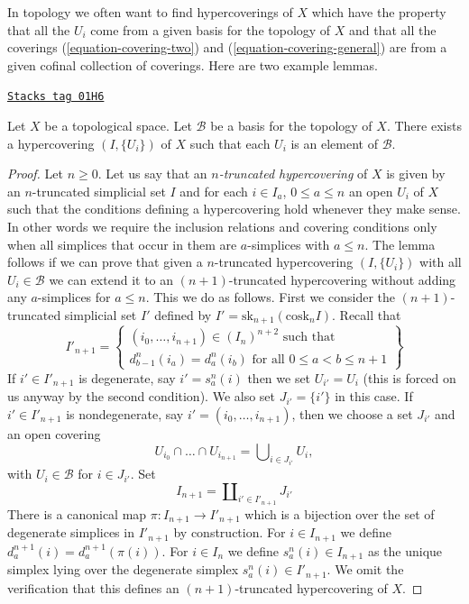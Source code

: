 In topology we often want to find hypercoverings of $X$ which
have the property that all the $U_i$ come from a given basis for the topology
of $X$ and that all the coverings
(\ref{equation-covering-two}) and (\ref{equation-covering-general})
are from a given cofinal collection of coverings.
Here are two example lemmas.

\begin{lemma}
\label{hypercovering-lemma-basis-hypercovering}
\href{https://stacks.math.columbia.edu/tag/01H6}{\texttt{Stacks tag 01H6}}

Let $X$ be a topological space.
Let $\mathcal{B}$ be a basis for the topology of $X$.
There exists a hypercovering $(I, \{U_i\})$ of $X$
such that each $U_i$ is an element of $\mathcal{B}$.
\end{lemma}

\begin{proof}
Let $n \geq 0$.
Let us say that an {\it $n$-truncated hypercovering} of $X$ is
given by an $n$-truncated simplicial set $I$ and for each
$i \in I_a$, $0 \leq a \leq n$ an open $U_i$ of $X$ such that
the conditions defining a hypercovering hold whenever they make sense.
In other words we require the inclusion relations and covering
conditions only when all simplices that occur in them
are $a$-simplices with $a \leq n$. The lemma follows if we can prove
that given a $n$-truncated hypercovering $(I, \{U_i\})$ with
all $U_i \in \mathcal{B}$ we can extend it to an $(n + 1)$-truncated
hypercovering without adding any $a$-simplices for $a \leq n$.
This we do as follows. First we consider the $(n + 1)$-truncated
simplicial set $I'$ defined by
$I' = \text{sk}_{n + 1}(\text{cosk}_n I)$.
Recall that
$$
I'_{n + 1} =
\left\{
\begin{matrix}
(i_0, \ldots, i_{n + 1}) \in (I_n)^{n + 2} \text{ such that}\\
d^n_{b - 1}(i_a) = d^n_a(i_b) \text{ for all }0\leq a < b\leq n + 1
\end{matrix}
\right\}
$$
If $i' \in I'_{n + 1}$ is degenerate, say $i' = s^n_a(i)$ then we set
$U_{i'} = U_i$ (this is forced on us anyway by the second condition).
We also set $J_{i'} = \{i'\}$ in this case.
If $i' \in I'_{n + 1}$ is nondegenerate, say
$i' = (i_0, \ldots, i_{n + 1})$, then we choose a set
$J_{i'}$ and an open covering
\begin{equation}
\label{equation-choose-covering}
U_{i_0} \cap \ldots \cap U_{i_{n + 1}} =
\bigcup\nolimits_{i \in J_{i'}} U_i,
\end{equation}
with $U_i \in \mathcal{B}$ for $i \in J_{i'}$.
Set
$$
I_{n + 1} = \coprod\nolimits_{i' \in I'_{n + 1}} J_{i'}
$$
There is a canonical map $\pi : I_{n + 1} \to I'_{n + 1}$ which is
a bijection over the set of degenerate simplices in $I'_{n + 1}$ by
construction.
For $i \in I_{n + 1}$ we define $d^{n + 1}_a(i) = d^{n + 1}_a(\pi(i))$.
For $i \in I_n$ we define $s^n_a(i) \in I_{n + 1}$ as the unique
simplex lying over the degenerate simplex $s^n_a(i) \in I'_{n + 1}$.
We omit the verification that this defines an $(n + 1)$-truncated
hypercovering of $X$.
\end{proof}

